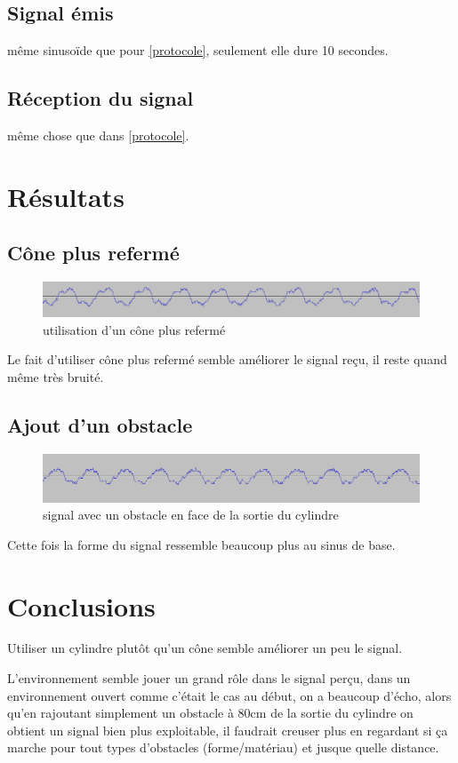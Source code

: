 \documentclass[12pt,a4paper]{report}
\begin{document}
\subsection{Signal émis}
même sinusoïde que pour \ref{protocole}, seulement elle dure 10 secondes.

\subsection{Réception du signal}
même chose que dans \ref{protocole}.

\section{Résultats}
\subsection{Cône plus refermé}
\begin{figure}[H]
\includegraphics[width=\textwidth]{img/cone_90_plus_fin.png}
\caption{utilisation d'un cône plus refermé}
\end{figure}
Le fait d'utiliser cône plus refermé semble améliorer le signal reçu, il reste quand même très bruité.

\subsection{Ajout d'un obstacle}
\begin{figure}[H]
\includegraphics[width=\textwidth]{img/cone+obstacle.png}
\caption{signal avec un obstacle en face de la sortie du cylindre}
\end{figure}
Cette fois la forme du signal ressemble beaucoup plus au sinus de base.

\section{Conclusions}
Utiliser un cylindre plutôt qu'un cône semble améliorer un peu le signal.

L'environnement semble jouer un grand rôle dans le signal perçu, dans un environnement ouvert comme c'était le cas au début, on a beaucoup d'écho, alors qu'en rajoutant simplement un obstacle à 80cm de la sortie du cylindre  on obtient un signal bien plus exploitable, il faudrait creuser plus en regardant si ça marche pour tout types d'obstacles (forme/matériau) et jusque quelle distance.
\end{document}
